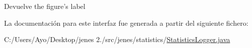 \begin{DoxyReturn}{Devuelve}
the figure's label 
\end{DoxyReturn}


La documentación para este interfaz fue generada a partir del siguiente fichero\-:\begin{DoxyCompactItemize}
\item 
C\-:/\-Users/\-Ayo/\-Desktop/jenes 2./src/jenes/statistics/\hyperlink{_statistics_logger_8java}{Statistics\-Logger.\-java}\end{DoxyCompactItemize}
